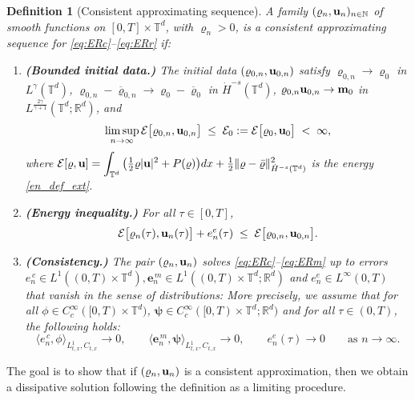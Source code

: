 \documentclass[12pt,a4paper,twoside]{article}
\newcommand{\Ov}[1]{\overline{#1}}
\newcommand{\vr}{\varrho}
\newcommand{\vu}{\vc{u}}
\newcommand{\vc}[1]{{\bf #1}}
\newcommand{\R}{\mathbb{R}}
\newtheorem{df}{Definition}
\numberwithin{equation}{section}%
\newcommand{\T}{\mathbb{T}}
\newcommand{\vm}{\vc{m}}
\begin{document}
\begin{df}[Consistent approximating sequence]\label{def:consistent}
	A family $(\vr_n, \vu_n)_{n\in\mathbb{N}}$ of smooth functions on $[0,T]\times\mathbb{T}^d$, with $\vr_n > 0$, is a \emph{consistent approximating sequence} for \eqref{eq:ERc}--\eqref{eq:ERr} if:
	\begin{enumerate}
		\item[(A1)] \textbf{(Bounded initial data.)} The initial data $(\vr_{0,n}, \vu_{0,n})$ satisfy $\vr_{0,n}\to\vr_0$ in $L^\gamma(\mathbb{T}^d)$, $\vr_{0,n}-\Ov{ \vr}_{0,n}\to\vr_0-\Ov{\vr}_0$ in $\dot H^{-s}(\T^d)$, $\vr_{0,n}\vu_{0,n}\to \vm_0$ in $L^{\frac{2\gamma}{\gamma+1}}(\mathbb{T}^d;\mathbb{R}^d)$, and
		\begin{equation}\label{app:id}
			\limsup_{n\to\infty} \mathcal{E}\big[\vr_{0,n},\vu_{0,n}\big] \;\le\; \mathcal{E}_0 := \mathcal{E}\big[\vr_0,\vu_0\big] \;<\; \infty,
			\end{equation}
		where $\displaystyle \mathcal{E}[\vr,\vu] = \int_{\mathbb{T}^d}\big(\tfrac12\vr|\vu|^2 + P(\vr)\big)dx + \tfrac12\|\vr-\bar\vr\|_{\dot H^{-s}(\mathbb{T}^d)}^2$ is the energy \eqref{en_def_ext}.
		\item[(A2)] \textbf{(Energy inequality.)} For all $\tau\in[0,T]$,
		\begin{equation}\label{app_ie}
			\mathcal{E}\big[\vr_n(\tau),\vu_n(\tau)\big] + e_n^{e}(\tau)\;\le\; \mathcal{E}\big[\vr_{0,n},\vu_{0,n}\big].
		\end{equation}
		\item[(A3)] \textbf{(Consistency.)} The pair $(\vr_n,\vu_n)$ solves \eqref{eq:ERc}--\eqref{eq:ERm} up to errors $e_n^{\,c} \in L^1((0,T)\times \T^d), \mathbf{e}_n^{\,m} \in L^1((0,T)\times \T^d;\R^d) $ and $ e_n^{e} \in L^{\infty}(0,T)$ that vanish in the sense of distributions: More precisely, we assume that for all $\phi\in C_c^\infty([0,T)\times\mathbb{T}^d)$, $\pmb\psi\in C_c^\infty([0,T)\times\mathbb{T}^d;\mathbb{R}^d)$ and for all $\tau \in (0,T)$, the following holds:
		\[
		\big\langle e_n^{\,c}, \phi \big\rangle_{L^1_{t,x}, C_{t,x}} \to 0,
		\qquad
		\big\langle \mathbf{e}_n^{\,m}, \pmb\psi \big\rangle_{L^1_{t,x}, C_{t,x}} \to 0, \qquad  e_n^{e}(\tau) \rightarrow 0
		\qquad\text{as } n\to\infty .
		\]
	\end{enumerate}
\end{df}
The goal is to show that if $(\vr_n,\vu_n)$ is a consistent approximation, then we obtain a dissipative solution following the definition as a limiting procedure.\par 
\end{document}
